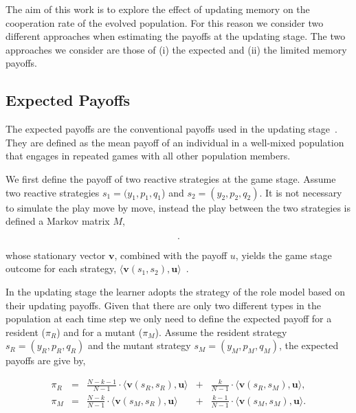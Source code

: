 \documentclass[11pt]{article}
\theoremstyle{plainCl1}
\theoremstyle{plainCl2}
\begin{document}
The aim of this work is to explore the effect of updating memory on the
cooperation rate of the evolved population. For this reason we consider two
different approaches when estimating the payoffs at the updating stage. The two
approaches we consider are those of (i) the expected and (ii) the limited memory
payoffs.

\subsection*{Expected Payoffs}

The expected payoffs are the conventional payoffs used in the updating
stage~\cite{imhof2010stochastic}. They are defined as the mean payoff of an
individual in a well-mixed population that engages in repeated games with all
other population members.

We first define the payoff of two reactive strategies at the game stage. Assume
two reactive strategies $s_1\!=\!(y_1, p_1, q_1$) and $s_2\!=\!(y_2,p_2,q_2)$.
It is not necessary to simulate the play move by move, instead the play between
the two strategies is defined a Markov matrix \(M\),

\begin{equation}\label{eq:transition_matrix}
  .
\end{equation}

whose stationary vector \(\mathbf{v}\), combined with the payoff \(u\), yields
the game stage outcome for each strategy,
\(\langle\mathbf{v}(s_1,s_2),\mathbf{u}\rangle\)~\cite{Hauert1997}.


In the updating stage the learner adopts the strategy of the role model based on
their updating payoffs. Given that there are only two different types in the
population at each time step we only need to define the expected payoff for a
resident (\(\pi_R\)) and for a mutant (\(\pi_M\)). Assume the resident strategy
\(s_R = (y_R, p_R, q_R)\) and the mutant strategy \(s_M = (y_M, p_M, q_M)\), the
expected payoffs are give by,

\begin{equation} \label{Eq:ExpPay}
  \begin{array}{lcrcr}
  \displaystyle \pi_R	&=	&\displaystyle \frac{N\!-\!k\!-\!1}{N-1}\cdot \langle\mathbf{v}(s_R,s_R),\mathbf{u}\rangle	&+	&\displaystyle\frac{k}{N-1}\cdot \langle\mathbf{v}(s_R,s_M),\mathbf{u}\rangle,\\[0.5cm]
  \displaystyle \pi_M	&=	&\displaystyle\frac{N-k}{N-1}\cdot \langle\mathbf{v}(s_M,s_R),\mathbf{u}\rangle&+	&\displaystyle\frac{k-1}{N-1}\cdot \langle\mathbf{v}(s_M,s_M),\mathbf{u}\rangle.\\
  \end{array}
\end{equation}
\end{document}
